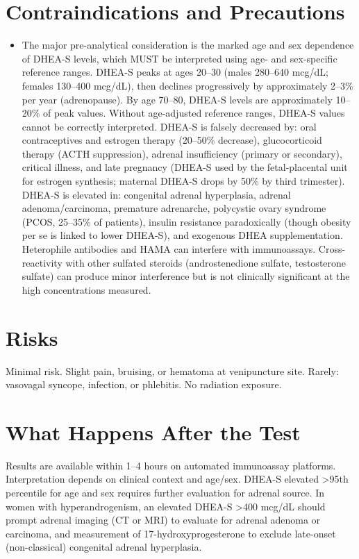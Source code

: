 \section*{Contraindications and Precautions}
\begin{itemize}
  \item The major pre-analytical consideration is the marked age and sex dependence of DHEA-S levels, which MUST be interpreted using age- and sex-specific reference ranges. DHEA-S peaks at ages 20--30 (males 280--640 mcg/dL; females 130--400 mcg/dL), then declines progressively by approximately 2--3\% per year (adrenopause). By age 70--80, DHEA-S levels are approximately 10--20\% of peak values. Without age-adjusted reference ranges, DHEA-S values cannot be correctly interpreted. DHEA-S is falsely decreased by: oral contraceptives and estrogen therapy (20--50\% decrease), glucocorticoid therapy (ACTH suppression), adrenal insufficiency (primary or secondary), critical illness, and late pregnancy (DHEA-S used by the fetal-placental unit for estrogen synthesis; maternal DHEA-S drops by 50\% by third trimester). DHEA-S is elevated in: congenital adrenal hyperplasia, adrenal adenoma/carcinoma, premature adrenarche, polycystic ovary syndrome (PCOS, 25--35\% of patients), insulin resistance paradoxically (though obesity per se is linked to lower DHEA-S), and exogenous DHEA supplementation. Heterophile antibodies and HAMA can interfere with immunoassays. Cross-reactivity with other sulfated steroids (androstenedione sulfate, testosterone sulfate) can produce minor interference but is not clinically significant at the high concentrations measured.
\end{itemize}
\section*{Risks}
Minimal risk. Slight pain, bruising, or hematoma at venipuncture site. Rarely: vasovagal syncope, infection, or phlebitis. No radiation exposure.

\section*{What Happens After the Test}
Results are available within 1--4 hours on automated immunoassay platforms. Interpretation depends on clinical context and age/sex. DHEA-S elevated >95th percentile for age and sex requires further evaluation for adrenal source. In women with hyperandrogenism, an elevated DHEA-S >400 mcg/dL should prompt adrenal imaging (CT or MRI) to evaluate for adrenal adenoma or carcinoma, and measurement of 17-hydroxyprogesterone to exclude late-onset (non-classical) congenital adrenal hyperplasia.

